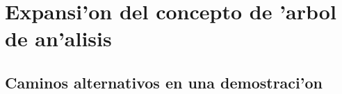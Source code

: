 \section{Expansi'on del concepto de 'arbol de an'alisis}

\subsection{Caminos alternativos en una demostraci'on}